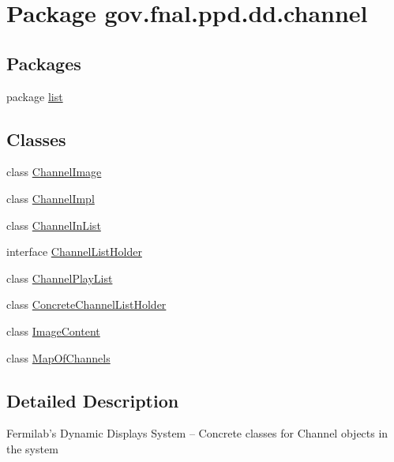 \hypertarget{namespacegov_1_1fnal_1_1ppd_1_1dd_1_1channel}{\section{Package gov.\-fnal.\-ppd.\-dd.\-channel}
\label{namespacegov_1_1fnal_1_1ppd_1_1dd_1_1channel}
}
\subsection*{Packages}
\begin{DoxyCompactItemize}
\item 
package \hyperlink{namespacegov_1_1fnal_1_1ppd_1_1dd_1_1channel_1_1list}{list}
\end{DoxyCompactItemize}
\subsection*{Classes}
\begin{DoxyCompactItemize}
\item 
class \hyperlink{classgov_1_1fnal_1_1ppd_1_1dd_1_1channel_1_1ChannelImage}{Channel\-Image}
\item 
class \hyperlink{classgov_1_1fnal_1_1ppd_1_1dd_1_1channel_1_1ChannelImpl}{Channel\-Impl}
\item 
class \hyperlink{classgov_1_1fnal_1_1ppd_1_1dd_1_1channel_1_1ChannelInList}{Channel\-In\-List}
\item 
interface \hyperlink{interfacegov_1_1fnal_1_1ppd_1_1dd_1_1channel_1_1ChannelListHolder}{Channel\-List\-Holder}
\item 
class \hyperlink{classgov_1_1fnal_1_1ppd_1_1dd_1_1channel_1_1ChannelPlayList}{Channel\-Play\-List}
\item 
class \hyperlink{classgov_1_1fnal_1_1ppd_1_1dd_1_1channel_1_1ConcreteChannelListHolder}{Concrete\-Channel\-List\-Holder}
\item 
class \hyperlink{classgov_1_1fnal_1_1ppd_1_1dd_1_1channel_1_1ImageContent}{Image\-Content}
\item 
class \hyperlink{classgov_1_1fnal_1_1ppd_1_1dd_1_1channel_1_1MapOfChannels}{Map\-Of\-Channels}
\end{DoxyCompactItemize}


\subsection{Detailed Description}
Fermilab's Dynamic Displays System -- Concrete classes for Channel objects in the system